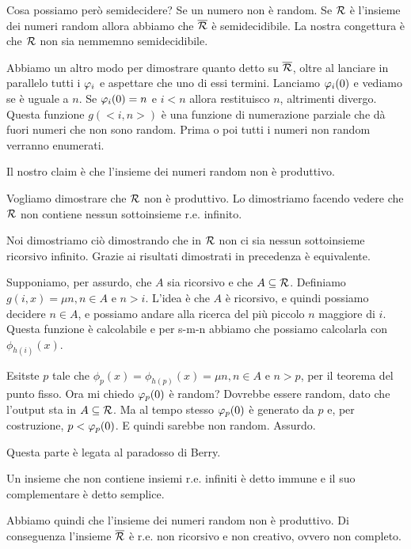 Cosa possiamo però semidecidere? Se un numero non è random. Se $\mathcal{R}$ è l'insieme dei numeri random
allora abbiamo che $\overline{\mathcal{R}}$ è semidecidibile. La nostra congettura è che $\mathcal{R}$ non sia nemmemno
semidecidibile.

Abbiamo un altro modo per dimostrare quanto detto su $\overline{\mathcal{R}}$, oltre al lanciare in parallelo
tutti i $\varphi_{i}$ e aspettare che uno di essi termini. Lanciamo $\varphi_{i}(0)$ e vediamo se è uguale a
$n$. Se $\varphi_{i}(0) = n$ e $i < n$ allora restituisco $n$, altrimenti divergo. Questa funzione
$g(<i,n>)$ è una funzione di numerazione parziale che dà fuori numeri che non sono random. Prima o
poi tutti i numeri non random verranno enumerati.

Il nostro claim è che l'insieme dei numeri random non è produttivo.

Vogliamo dimostrare che $\mathcal{R}$ non è produttivo. Lo dimostriamo facendo vedere che $\mathcal{R}$ non contiene
nessun sottoinsieme r.e. infinito.

Noi dimostriamo ciò dimostrando che in $\mathcal{R}$ non ci sia nessun sottoinsieme ricorsivo infinito.
Grazie ai risultati dimostrati in precedenza è equivalente.

Supponiamo, per assurdo, che $A$ sia ricorsivo e che $A \subseteq \mathcal{R}$. Definiamo $g(i,x) = \mu n, n \in A$
e $n > i$. L'idea è che $A$ è ricorsivo, e quindi possiamo decidere $n \in A$, e possiamo andare alla
ricerca del più piccolo $n$ maggiore di $i$. Questa funzione è calcolabile e per s-m-n abbiamo che
possiamo calcolarla con $\phi_{h(i)}(x)$. 

Esitste $p$ tale che $\phi_{p}(x) = \phi_{h(p)}(x) = \mu n, n \in A$ e $n > p$, per il teorema del
punto fisso. Ora mi chiedo $\varphi_{p}(0)$ è random? Dovrebbe essere random, dato che l'output sta in $A
\subseteq \mathcal{R}$. Ma al tempo stesso $\varphi_{p}(0)$ è generato da $p$ e, per costruzione, $p < \varphi_{p}(0)$. E
quindi sarebbe non random. Assurdo.

Questa parte è legata al paradosso di Berry.

Un insieme che non contiene insiemi r.e. infiniti è detto immune e il suo complementare è detto
semplice.

Abbiamo quindi che l'insieme dei numeri random non è produttivo. Di conseguenza l'insieme $\overline{\mathcal{R}}$ 
è r.e. non ricorsivo e non creativo, ovvero non completo.
